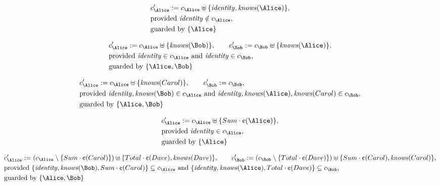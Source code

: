 \begin{align*}
&
c'_
{
\Alice
}
 := 
c_
{
\Alice
}
 \uplus 
\{
\mathit{
identity
}
,
\mathit{
knows
}
(
\Alice
)
\}
,\\
&
\text{provided } 
\mathit{
identity
}
 \notin c_
{
\Alice
}
,\\
&
\text{guarded by } \{
\Alice
\}
\end{align*}

\begin{align*}
&
c'_
{
\Alice
}
 := 
c_
{
\Alice
}
 \uplus 
\{
\mathit{
knows
}
(
\Bob
)
\}
, \qquad 
c'_
{
\Bob
}
 := 
c_
{
\Bob
}
 \uplus 
\{
\mathit{
knows
}
(
\Alice
)
\}
,\\
&
\text{provided } 
\mathit{
identity
}
 \in c_
{
\Alice
}
 \text{ and } 
\mathit{
identity
}
 \in c_
{
\Bob
}
,\\
&
\text{guarded by } \{
\Alice
,
\Bob
\}
\end{align*}

\begin{align*}
&
c'_
{
\Alice
}
 := 
c_
{
\Alice
}
 \uplus 
\{
\mathit{
knows
}
(
Carol
)
\}
, \qquad 
c'_
{
\Bob
}
 := 
c_
{
\Bob
}
,\\
&
\text{provided } 
\mathit{
identity
}
,
\mathit{
knows
}
(
\Bob
)
 \in c_
{
\Alice
}
 \text{ and } 
\mathit{
identity
}
,
\mathit{
knows
}
(
\Alice
)
,
\mathit{
knows
}
(
Carol
)
 \in c_
{
\Bob
}
,\\
&
\text{guarded by } \{
\Alice
,
\Bob
\}
\end{align*}

\begin{align*}
&
c'_
{
\Alice
}
 := 
c_
{
\Alice
}
 \uplus 
\{
Sum
\cdot
\text{\textcent}
(
\Alice
)
\}
,\\
&
\text{provided } 
\mathit{
identity
}
 \in c_
{
\Alice
}
,\\
&
\text{guarded by } \{
\Alice
\}
\end{align*}

\begin{align*}
&
c'_
{
\Alice
}
 := 
(c_
{
\Alice
}
 \setminus 
\{
Sum
\cdot
\text{\textcent}
(
Carol
)
\}
) \uplus 
\{
Total
\cdot
\text{\textcent}
(
Dave
)
,
\mathit{
knows
}
(
Dave
)
\}
, \qquad 
c'_
{
\Bob
}
 := 
(c_
{
\Bob
}
 \setminus 
\{
Total
\cdot
\text{\textcent}
(
Dave
)
\}
) \uplus 
\{
Sum
\cdot
\text{\textcent}
(
Carol
)
,
\mathit{
knows
}
(
Carol
)
\}
,\\
&
\text{provided } 
\{
\mathit{
identity
}
,
\mathit{
knows
}
(
\Bob
)
,
Sum
\cdot
\text{\textcent}
(
Carol
)
\}
 \subseteq c_
{
\Alice
}
 \text{ and } 
\{
\mathit{
identity
}
,
\mathit{
knows
}
(
\Alice
)
,
Total
\cdot
\text{\textcent}
(
Dave
)
\}
 \subseteq c_
{
\Bob
}
,\\
&
\text{guarded by } \{
\Alice
,
\Bob
\}
\end{align*}
